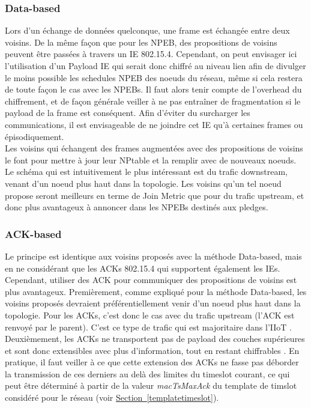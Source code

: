 \documentclass[]{report}
\newcommand{\wordlink}[2]{\hyperref[#2]{#1~\ref{#2}}}
\begin{document}
\subsubsection{Data-based}

Lors d'un échange de données quelconque, une frame est échangée entre deux voisins. De la même façon que pour les NPEB, des propositions de voisins peuvent être passées à travers un IE 802.15.4. Cependant, on peut envisager ici l'utilisation d'un Payload IE qui serait donc chiffré au niveau lien afin de divulger le moins possible les schedules NPEB des noeuds du réseau, même si cela restera de toute façon le cas avec les NPEBs. Il faut alors tenir compte de l'overhead du chiffrement, et de façon générale veiller à ne pas entraîner de fragmentation si le payload de la frame est conséquent. Afin d'éviter du surcharger les communications, il est envisageable de ne joindre cet IE qu'à certaines frames ou épisodiquement.\\

Les voisins qui échangent des frames augmentées avec des propositions de voisins le font pour mettre à jour leur NPtable et la remplir avec de nouveaux noeuds. Le schéma qui est intuitivement le plus intéressant est du trafic downstream, venant d'un noeud plus haut dans la topologie. Les voisins qu'un tel noeud propose seront meilleurs en terme de Join Metric que pour du trafic upstream, et donc plus avantageux à annoncer dans les NPEBs destinés aux pledges.

\subsubsection{ACK-based}

Le principe est identique aux voisins proposés avec la méthode Data-based, mais en ne considérant que les ACKs 802.15.4 qui supportent également les IEs. Cependant, utiliser des ACK pour communiquer des propositions de voisins est plus avantageux. Premièrement, comme expliqué pour la méthode Data-based, les voisins proposés devraient préférentiellement venir d'un noeud plus haut dans la topologie. Pour les ACKs, c'est donc le cas avec du trafic upstream (l'ACK est renvoyé par le parent). C'est ce type de trafic qui est majoritaire dans l'IIoT \cite{openbenchmark}. Deuxièmement, les ACKs ne transportent pas de payload des couches supérieures et sont donc extensibles avec plus d'information, tout en restant chiffrables \cite{IEEE802.15.4}. En pratique, il faut veiller à ce que cette extension des ACKs ne fasse pas déborder la transmission de ces derniers au delà des limites du timeslot courant, ce qui peut être déterminé à partir de la valeur \textit{macTsMaxAck} du template de timslot considéré pour le réseau (voir \wordlink{Section}{templatetimeslot}).
\end{document}
